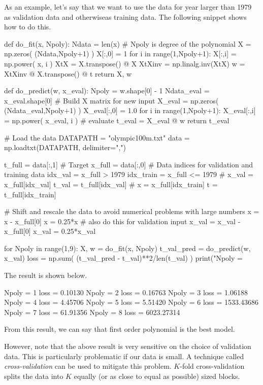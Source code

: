 \documentclass[b5paper,12pt]{article} %
\begin{document}
As an example, let's say that we want to use the data for year larger
than 1979 as validation data and otherwiseas training data. The following
snippet shows how to do this.
\begin{pythoncode}
def do_fit(x, Npoly):
    Ndata = len(x)
    # Npoly is degree of the polynomial
    X = np.zeros( (Ndata,Npoly+1) )
    X[:,0] = 1
    for i in range(1,Npoly+1):
        X[:,i] = np.power( x, i )
    XtX = X.transpose() @ X
    XtXinv = np.linalg.inv(XtX)
    w = XtXinv @ X.transpose() @ t
    return X, w
  
def do_predict(w, x_eval):
    Npoly = w.shape[0] - 1
    Ndata_eval = x_eval.shape[0]
    # Build X matrix for new input
    X_eval = np.zeros( (Ndata_eval,Npoly+1) )
    X_eval[:,0] = 1.0
    for i in range(1,Npoly+1):
        X_eval[:,i] = np.power( x_eval, i )
    # evaluate
    t_eval = X_eval @ w
    return t_eval
  
# Load the data
DATAPATH = "olympic100m.txt"
data = np.loadtxt(DATAPATH, delimiter=",")
  
t_full = data[:,1] # Target
x_full = data[:,0]
# Data indices for validation and training data
idx_val = x_full > 1979
idx_train = x_full <= 1979
#
x_val = x_full[idx_val]
t_val = t_full[idx_val]
#
x = x_full[idx_train]
t = t_full[idx_train]
  
# Shift and rescale the data to avoid numerical problems with large numbers
x = x - x_full[0]
x = 0.25*x
# also do this for validation input
x_val = x_val - x_full[0]
x_val = 0.25*x_val
  
for Npoly in range(1,9):
    X, w = do_fit(x, Npoly)
    t_val_pred = do_predict(w, x_val)
    loss = np.sum( (t_val_pred - t_val)**2/len(t_val) )
    print("Npoly = %
\end{pythoncode}

The result is shown below.
\begin{textcode}
Npoly =  1   loss =    0.10130
Npoly =  2   loss =    0.16763
Npoly =  3   loss =    1.06188
Npoly =  4   loss =    4.45706
Npoly =  5   loss =    5.51420
Npoly =  6   loss = 1533.43686
Npoly =  7   loss =   61.91356
Npoly =  8   loss = 6023.27314
\end{textcode}
From this result, we can say that first order polynomial is the best model.

However, note that the above result is very sensitive on the choice of validation data.
This is particularly problematic if our data is small.
A technique called \emph{cross-validation} can be used to mitigate this problem.
$K$-fold cross-validation splits the data into $K$ equally (or as close to equal as
possible) sized blocks.
\end{document}
